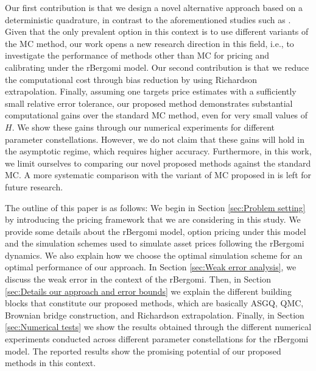 Our first contribution is that we design a novel alternative approach based on a deterministic quadrature, in contrast to the aforementioned studies such as \cite{mccrickerd2018turbocharging}. Given that the only prevalent option in this context is to use different variants of the MC method, our work opens a new  research direction in this field, i.e.,  to investigate the performance of methods other than MC for pricing and calibrating under the rBergomi model. Our second contribution is that we reduce the computational cost  through bias reduction by using Richardson extrapolation. Finally, assuming one targets price estimates with a sufficiently small relative error tolerance, our proposed method demonstrates substantial computational gains  over the standard MC method, even for very small values of  $H$. We show  these gains through our numerical experiments for  different parameter constellations. However, we do not claim that these gains will hold in the asymptotic regime, which requires higher accuracy. Furthermore,  in this work, we limit ourselves to comparing our novel proposed methods against the standard MC. A more systematic comparison with the variant of MC proposed in \cite{mccrickerd2018turbocharging} is left for future research. 

The outline of this paper is as follows: We begin in Section \ref{sec:Problem setting} by  introducing  the pricing framework that we are considering in this study. We provide some details about the rBergomi model, option pricing under this model and the simulation schemes used to simulate asset prices following the rBergomi dynamics. We also  explain how we choose the optimal simulation scheme for an optimal performance of our approach. In Section \ref{sec:Weak error analysis}, we discuss the weak error in the context of the rBergomi. Then, in Section \ref{sec:Details our approach and error bounds} we explain the different building blocks that constitute our proposed methods, which are basically ASGQ, QMC, Brownian bridge construction, and Richardson extrapolation. Finally, in Section \ref{sec:Numerical tests} we show the results obtained through the different numerical experiments conducted across different parameter constellations for the rBergomi model. The reported results show the promising potential of our proposed methods in this context.